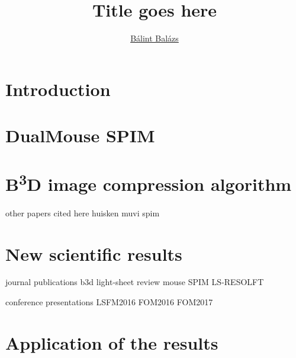 \documentclass{theses_style}
\author{\href{mailto:balint.balazs@embl.de}{Bálint Balázs}}
\title{Title goes here}
\def\b3d{B\textsuperscript{3}D}
\begin{document}
\maketitle

\newpage
\setcounter{page}{1}
\section{Introduction}

\section{DualMouse SPIM}

\section{\b3d image compression algorithm}
other papers cited here
huisken \cite{huisken_optical_2004}
muvi spim \cite{krzic_multiview_2012}

\section{New scientific results}
journal publications
b3d \cite{balazs_real-time_2017}
light-sheet review \cite{de_medeiros_light-sheet_2016}
mouse SPIM \cite{strnad_inverted_2016}
LS-RESOLFT \cite{hoyer_breaking_2016}

conference presentations
LSFM2016 \cite{balazs_gpu-based_2016}
FOM2016 \cite{balazs_gpu-based_2016-1}
FOM2017 \cite{balazs_gpu-based_2017}

\section{Application of the results}

%
%
\printbibliography[category=journal, title={The Author's journal publications}]

\printbibliography[category=conference, title={The Author's conference presentations}]

\newrefcontext
\printbibliography[notcategory=journal,notcategory=conference, resetnumbers=true, title={References}]
\end{document}
